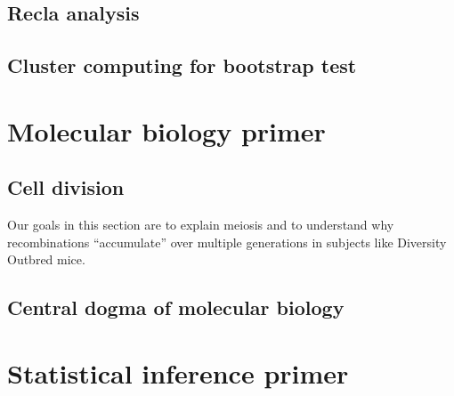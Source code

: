 \documentclass[oneside]{book}\usepackage[]{graphicx}\usepackage[]{color}
\begin{document}
\section{Recla analysis}

\section{Cluster computing for bootstrap test}





\printbibliography



\newpage
\begin{appendices}
\appendixpage

\chapter{Molecular biology primer}\label{sec:bio-primer}





\section{Cell division}\label{sec:cell-division}

Our goals in this section are to explain meiosis and to understand why recombinations ``accumulate'' over multiple generations in subjects like Diversity Outbred mice. 




\section{Central dogma of molecular biology}\label{sec:central-dogma}



\chapter{Statistical inference primer}\label{sec:stat-primer}


\end{appendices}
\end{document}
